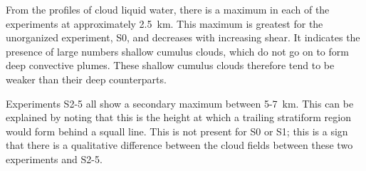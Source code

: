 \documentclass[11pt,a4paper]{article}
\newcommand\todo[1]{\textbf{TODO: #1}}
\begin{document}
From the profiles of cloud liquid water, there is a maximum in each of the experiments at approximately \SI{2.5}{km}. This maximum is greatest for the unorganized experiment, S0, and decreases with increasing shear. It indicates the presence of large numbers shallow cumulus clouds, which do not go on to form deep convective plumes. These shallow cumulus clouds therefore tend to be weaker than their deep counterparts.

Experiments S2-5 all show a secondary maximum between \SI{5}{}-\SI{7}{km}. This can be explained by noting that this is the height at which a trailing stratiform region would form behind a squall line. This is not present for S0 or S1; this is a sign that there is a qualitative difference between the cloud fields between these two experiments and S2-5.

\end{document}
